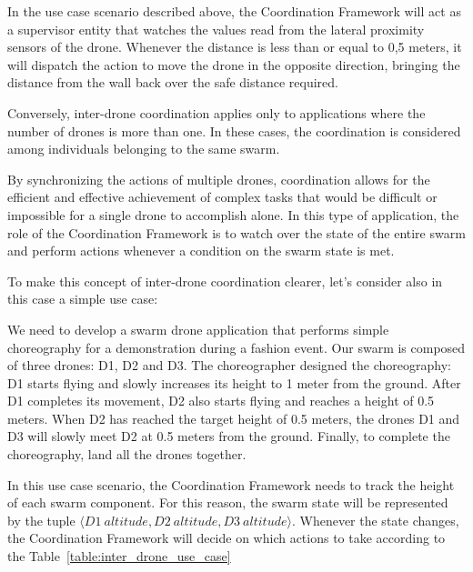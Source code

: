In the use case scenario described above, the Coordination Framework will act as a supervisor entity that watches the values read from the lateral proximity sensors of the drone. 
Whenever the distance is less than or equal to 0,5 meters, it will dispatch the action to move the drone in the opposite direction, bringing the distance from the wall back over the safe distance required.

Conversely, inter-drone coordination applies only to applications where the number of drones is more than one.
In these cases, the coordination is considered among individuals belonging to the same swarm.

By synchronizing the actions of multiple drones, coordination allows for the efficient and effective achievement of complex tasks that would be difficult or impossible for a single drone to accomplish alone. 
In this type of application, the role of the Coordination Framework is to watch over the state of the entire swarm and perform actions whenever a condition on the swarm state is met.

To make this concept of inter-drone coordination clearer, let's consider also in this case a simple use case:

\begin{displayquote}
    We need to develop a swarm drone application that performs simple choreography for a demonstration during a fashion event. 
    Our swarm is composed of three drones: D1, D2 and D3. 
    The choreographer designed the choreography: D1 starts flying and slowly increases its height to 1 meter from the ground. 
    After D1 completes its movement, D2 also starts flying and reaches a height of 0.5 meters. 
    When D2 has reached the target height of 0.5 meters, the drones D1 and D3 will slowly meet D2 at 0.5 meters from the ground. 
    Finally, to complete the choreography, land all the drones together.
\end{displayquote}

In this use case scenario, the Coordination Framework needs to track the height of each swarm component.
For this reason, the swarm state will be represented by the tuple \(\langle D1~altitude, D2~altitude, D3~altitude \rangle\). 
Whenever the state changes, the Coordination Framework will decide on which actions to take according to the Table~\ref{table:inter_drone_use_case}

